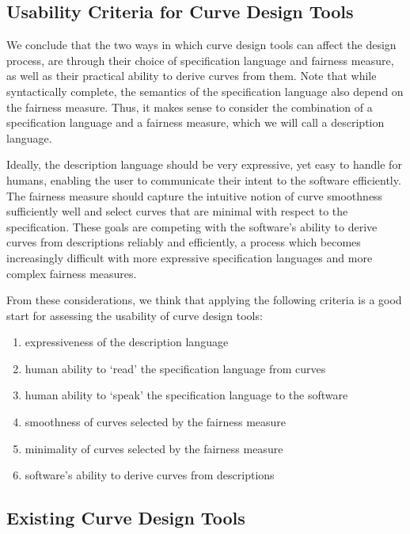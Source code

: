 \documentclass[a4paper]{article}
\begin{document}
		\subsection{Usability Criteria for Curve Design Tools}
		\label{section:usability_criteria_curve_design_tools}

			We conclude that the two ways in which curve design tools can affect the design process, are through their choice of specification language and fairness measure, as well as their practical ability to derive curves from them. Note that while syntactically complete, the semantics of the specification language also depend on the fairness measure. Thus, it makes sense to consider the combination of a specification language and a fairness measure, which we will call a description language.

			Ideally, the description language should be very expressive, yet easy to handle for humans, enabling the user to communicate their intent to the software efficiently. The fairness measure should capture the intuitive notion of curve smoothness sufficiently well and select curves that are minimal with respect to the specification. These goals are competing with the software's ability to derive curves from descriptions reliably and efficiently, a process which becomes increasingly difficult with more expressive specification languages and more complex fairness measures.

			From these considerations, we think that applying the following criteria is a good start for assessing the usability of curve design tools:
			\begin{enumerate}
				\item expressiveness of the description language
				\item human ability to `read' the specification language from curves
				\item human ability to `speak' the specification language to the software
				\item smoothness of curves selected by the fairness measure
				\item minimality of curves selected by the fairness measure
				\item software's ability to derive curves from descriptions
			\end{enumerate}

		\subsection{Existing Curve Design Tools}
		\label{section:existing_curve_design_tools}
\end{document}
